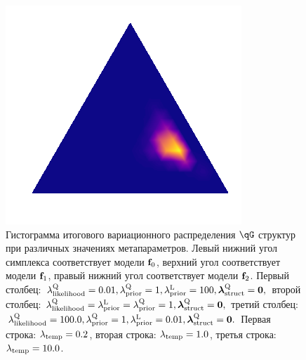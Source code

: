 \begin{figure}
\begin{minipage}{.3\textwidth}
\subcaption{}
\end{minipage}
 \begin{minipage}{.3\textwidth}
    \includegraphics[width=\textwidth]{plots/experiment_structures/triangle_10overfit.png}
\subcaption{}
\end{minipage}
\caption{Гистограмма итогового вариационного распределения $\qG$ структур при различных значениях метапараметров. Левый нижний угол симплекса соответствует модели $\mathbf{f}_0$, верхний угол соответствует модели $\mathbf{f}_1$, правый нижний угол соответствует модели $\mathbf{f}_2$.
Первый столбец:  $\lambda_\text{likelihood}^\text{Q} = 0.01, \lambda_\text{prior}^\text{Q} = 1, \lambda_\text{prior}^\text{L} = 100, \boldsymbol{\lambda}_\text{struct}^\text{Q} = \mathbf{0},$  второй столбец: $\lambda_\text{likelihood}^\text{Q} = \lambda_\text{prior}^\text{L} = \lambda_\text{prior}^\text{Q} = 1, \boldsymbol{\lambda}_\text{struct}^\text{Q} = \mathbf{0},$ 
третий столбец: $\lambda_\text{likelihood}^\text{Q} = 100.0, \lambda_\text{prior}^\text{Q} = 1, \lambda_\text{prior}^\text{L} = 0.01, \boldsymbol{\lambda}_\text{struct}^\text{Q} = \mathbf{0}.$ 
Первая строка: $\lambda_{\text{temp}} = 0.2$, вторая строка: $\lambda_{\text{temp}} = 1.0$, третья строка: $\lambda_{\text{temp}} = 10.0$.}
\label{fig:fig_triangle_hist}
\end{figure}


